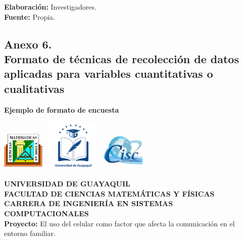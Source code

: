 \documentclass[12pt, a4paper, nofontenc, numbers=endperiod]{apa7}
\begin{document}
{\begin{table}[h]
{{\begin{tabular}{|c|c|c|}
				\hline
			\end{tabular}
		}
	}
\end{table}
\vspace*{-1cm}
\begin{center}
	\footnotesize
	\singlespacing\textbf{Elaboración:} Investigadores.\\
	\textbf{Fuente:} Propia.
\end{center}



\newpage
\subsection*{\normalsize \centering Anexo 6. \\ Formato de técnicas de recolección de datos aplicadas para variables  cuantitativas o cualitativas \\ }


\begin{center}
	\textbf{Ejemplo de formato de encuesta}
\end{center}

\includegraphics[width=2cm,height=2cm]{Imagenes/Figura14}
\hspace*{4cm}	\includegraphics[width=3cm,height=2.5cm]{Imagenes/Figura1}
\hspace*{3.7cm}	\includegraphics[width=2cm,height=2cm]{Imagenes/Figura15}

{\centering
	\textbf{ UNIVERSIDAD DE GUAYAQUIL} \\[-0.1cm]
	\textbf{ FACULTAD DE CIENCIAS MATEMÁTICAS Y FÍSICAS} \\ [-0.1cm]
	\textbf{ CARRERA DE INGENIERÍA EN SISTEMAS COMPUTACIONALES} \\ [0.5cm]
}
\setlength{\parindent}{0cm}\textbf{Proyecto:} El uso del celular como factor que afecta la comunicación en el entorno familiar.

}
\end{document}
